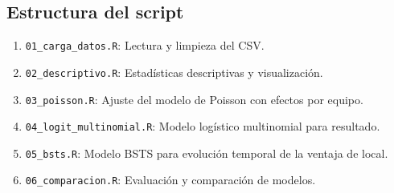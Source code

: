\documentclass[a4paper,12pt]{article}
\begin{document}
\subsection*{Estructura del script}

\begin{enumerate}
    \item \texttt{01\_carga\_datos.R}: Lectura y limpieza del CSV.
    \item \texttt{02\_descriptivo.R}: Estadísticas descriptivas y visualización.
    \item \texttt{03\_poisson.R}: Ajuste del modelo de Poisson con efectos por equipo.
    \item \texttt{04\_logit\_multinomial.R}: Modelo logístico multinomial para resultado.
    \item \texttt{05\_bsts.R}: Modelo BSTS para evolución temporal de la ventaja de local.
    \item \texttt{06\_comparacion.R}: Evaluación y comparación de modelos.
\end{enumerate}
\end{document}
